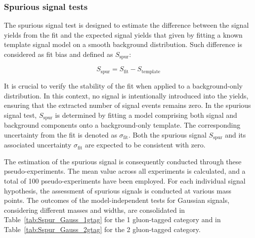 \subsubsection{Spurious signal tests}

The spurious signal test is designed to estimate the difference between the signal yields from the fit and the expected signal yields that given by fitting a known template signal model on a smooth background distribution. Such difference is considered as fit bias and defined as $S_\mathrm{spur}$:

\begin{equation}
 S_\mathrm{spur} = S_\mathrm{fit} - S_\mathrm{template}
\end{equation}

It is crucial to verify the stability of the fit when applied to a background-only distribution. In this context, no signal is intentionally introduced into the yields, ensuring that the extracted number of signal events remains zero. In the spurious signal test, $S_\mathrm{spur}$ is determined by fitting a model comprising both signal and background components onto a background-only template. The corresponding uncertainty from the fit is denoted as $\sigma_\mathrm{fit}$. Both the spurious signal $S_\mathrm{spur}$ and its associated uncertainty $\sigma_\mathrm{fit}$ are expected to be consistent with zero.

The estimation of the spurious signal is consequently conducted through these pseudo-experiments. The mean value across all experiments is calculated, and a total of 100 pseudo-experiments have been employed. For each individual signal hypothesis, the assessment of spurious signals is conducted at various mass points. The outcomes of the model-independent tests for Gaussian signals, considering different masses and widths, are consolidated in Table~\ref{tab:Sspur_Gauss_1gtag} for the 1 gluon-tagged category and in Table~\ref{tab:Sspur_Gauss_2gtag} for the 2 gluon-tagged category. %

